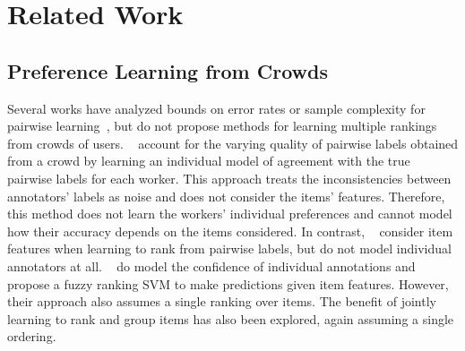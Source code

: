 \section{Related Work}
\label{sec:rw}

\subsection{Preference Learning from Crowds}

Several works have analyzed bounds on error rates or sample complexity for pairwise 
learning~\citep{chen2015spectral,shah2015estimation}, but do not propose methods
for learning multiple rankings from crowds of users.
~\citet{chen2013pairwise} account for the varying quality of pairwise labels obtained from a crowd
by learning an individual model of agreement with the true pairwise labels for each worker.  
This approach treats the inconsistencies between annotators' labels as noise and does not consider the
items' features. Therefore, this method does not learn the workers' individual preferences
and cannot model how their accuracy depends on the items considered. 
In contrast, ~\citet{fu2016robust} consider item features when learning to rank from pairwise labels, 
but do not model individual annotators at all.
~\citet{uchida2017entity} do model the confidence of individual annotations
and propose a fuzzy ranking SVM to make predictions given item features. 
However, their approach also assumes a single ranking over items.
The benefit of jointly learning to rank and group items has also been explored\citep{li2018simultaneous}, again assuming a single ordering.

